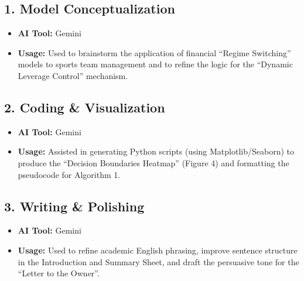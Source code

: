 \documentclass{mcmthesis}
\begin{document}
\subsection*{1. Model Conceptualization}
\begin{itemize}
    \item \textbf{AI Tool:} Gemini
    \item \textbf{Usage:} Used to brainstorm the application of financial ``Regime Switching'' models to sports team management and to refine the logic for the ``Dynamic Leverage Control'' mechanism.
\end{itemize}

\subsection*{2. Coding \& Visualization}
\begin{itemize}
    \item \textbf{AI Tool:} Gemini
    \item \textbf{Usage:} Assisted in generating Python scripts (using Matplotlib/Seaborn) to produce the ``Decision Boundaries Heatmap'' (Figure 4) and formatting the pseudocode for Algorithm 1.
\end{itemize}

\subsection*{3. Writing \& Polishing}
\begin{itemize}
    \item \textbf{AI Tool:} Gemini
    \item \textbf{Usage:} Used to refine academic English phrasing, improve sentence structure in the Introduction and Summary Sheet, and draft the persuasive tone for the ``Letter to the Owner''.
\end{itemize}



\end{document}
